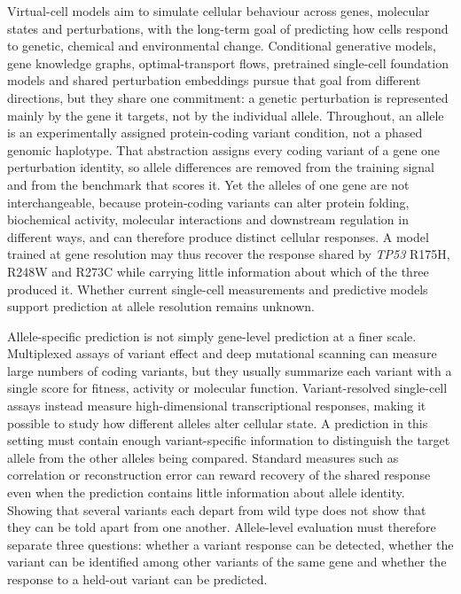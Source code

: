 \documentclass[11pt,letterpaper]{article}
\begin{document}
Virtual-cell models aim to simulate cellular behaviour across genes, molecular states and perturbations, with the long-term goal of predicting how cells respond to genetic, chemical and environmental change\cite{AIVirtualCell2024,MultimodalFM2025,VirtualCellNews2025}. Conditional generative models\cite{scGen,CPA2023}, gene knowledge graphs\cite{GEARS}, optimal-transport flows\cite{CellFlow}, pretrained single-cell foundation models\cite{scGPT,scFoundation,UCE} and shared perturbation embeddings\cite{UniPert} pursue that goal from different directions, but they share one commitment: a genetic perturbation is represented mainly by the gene it targets, not by the individual allele\cite{Adamson2016,Replogle2022,Tahoe100M}. Throughout, an allele is an experimentally assigned protein-coding variant condition, not a phased genomic haplotype. That abstraction assigns every coding variant of a gene one perturbation identity, so allele differences are removed from the training signal and from the benchmark that scores it. Yet the alleles of one gene are not interchangeable, because protein-coding variants can alter protein folding, biochemical activity, molecular interactions and downstream regulation in different ways, and can therefore produce distinct cellular responses\cite{Baugh2018,Hunter2015,Sahni2015}. A model trained at gene resolution may thus recover the response shared by \textit{TP53} R175H, R248W and R273C while carrying little information about which of the three produced it. Whether current single-cell measurements and predictive models support prediction at allele resolution remains unknown.

Allele-specific prediction is not simply gene-level prediction at a finer scale. Multiplexed assays of variant effect and deep mutational scanning can measure large numbers of coding variants, but they usually summarize each variant with a single score for fitness, activity or molecular function\cite{ProteinGym,MaveDB}. Variant-resolved single-cell assays instead measure high-dimensional transcriptional responses, making it possible to study how different alleles alter cellular state\cite{Ursu2022,PerturbNet,Cooper2024}. A prediction in this setting must contain enough variant-specific information to distinguish the target allele from the other alleles being compared. Standard measures such as correlation or reconstruction error can reward recovery of the shared response even when the prediction contains little information about allele identity. Showing that several variants each depart from wild type does not show that they can be told apart from one another. Allele-level evaluation must therefore separate three questions: whether a variant response can be detected, whether the variant can be identified among other variants of the same gene and whether the response to a held-out variant can be predicted.
\end{document}
